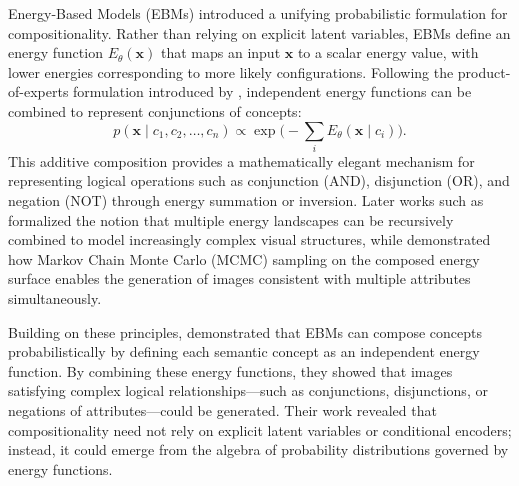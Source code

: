 Energy-Based Models (EBMs) introduced a unifying probabilistic formulation for compositionality.  
Rather than relying on explicit latent variables, EBMs define an energy function $E_\theta(\mathbf{x})$ that maps an input $\mathbf{x}$ to a scalar energy value, with lower energies corresponding to more likely configurations.  
Following the product-of-experts formulation introduced by \citet{product_of_experts}, independent energy functions can be combined to represent conjunctions of concepts:
\[
p(\mathbf{x} \mid c_1, c_2, \dots, c_n) \propto \exp\!\Big(-\sum_i E_\theta(\mathbf{x} \mid c_i)\Big).
\]
This additive composition provides a mathematically elegant mechanism for representing logical operations such as conjunction (AND), disjunction (OR), and negation (NOT) through energy summation or inversion.  
Later works such as \citet{shazeer2017outrageously,multi_object_representation_learning_iterative_variational_inference_2019} formalized the notion that multiple energy landscapes can be recursively combined to model increasingly complex visual structures, while \citet{NEURIPS2020_49856ed4} demonstrated how Markov Chain Monte Carlo (MCMC) sampling on the composed energy surface enables the generation of images consistent with multiple attributes simultaneously.

Building on these principles, \citet{NEURIPS2020_49856ed4} demonstrated that EBMs can compose concepts probabilistically by defining each semantic concept as an independent energy function.  
By combining these energy functions, they showed that images satisfying complex logical relationships—such as conjunctions, disjunctions, or negations of attributes—could be generated.  
Their work revealed that compositionality need not rely on explicit latent variables or conditional encoders; instead, it could emerge from the algebra of probability distributions governed by energy functions.  


